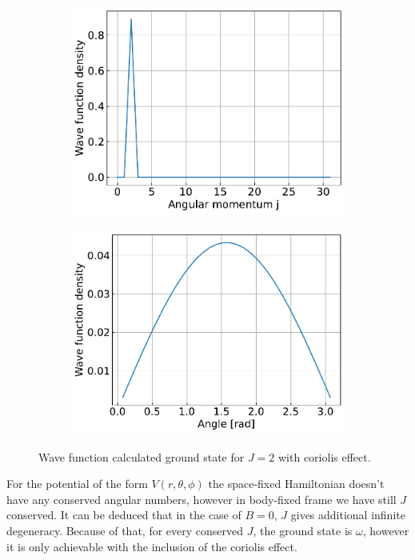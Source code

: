 \documentclass{article}
\begin{document}
\begin{figure}[H]
\begin{subfigure}{.4\linewidth}
            \includegraphics[width=\linewidth]{harmonic_iso_coriolis_angular.pdf}
        \end{subfigure}
        \begin{subfigure}{.4\linewidth}
            \centering
            \includegraphics[width=\linewidth]{harmonic_iso_coriolis_polar.pdf}
        \end{subfigure}   
        \caption{Wave function calculated ground state for $J = 2$ with coriolis effect.}
    \end{figure}

    For the potential of the form $V(r, \theta, \phi)$ the space-fixed Hamiltonian doesn't have any
    conserved angular numbers, however in body-fixed frame we have still $J$ conserved.
    It can be deduced that in the case of $B = 0$, $J$ gives additional infinite degeneracy.
    Because of that, for every conserved $J$, the ground state is $\omega$, however it is only achievable
    with the inclusion of the coriolis effect.
\end{document}
